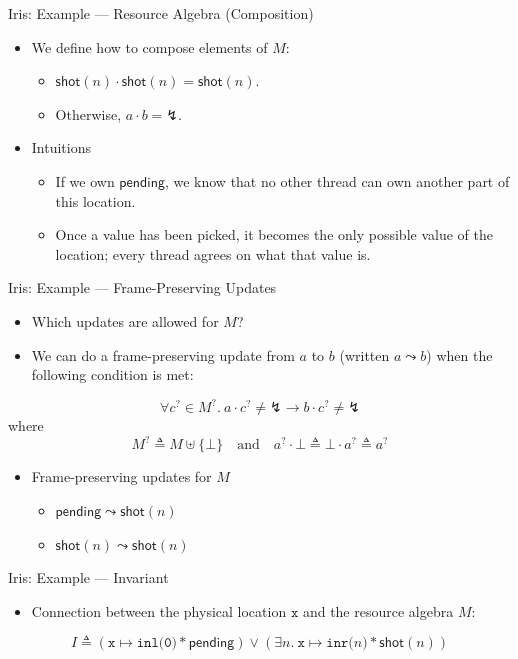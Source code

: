 \documentclass{beamer}
\newcommand{\pending}{\mathsf{pending}}
\newcommand{\shot}{\mathsf{shot}}
\newcommand{\invalid}{\mathord{\lightning}}
\begin{document}
\begin{frame}{Iris: Example --- Resource Algebra (Composition)}
  \begin{itemize}
    \item We define how to compose elements of $M$:
      \begin{itemize}
        \item $\shot(n)\cdot\shot(n)=\shot(n)$.
        \item Otherwise, $a\cdot b=\invalid$.
      \end{itemize}
    \item Intuitions
      \begin{itemize}
        \item If we own $\pending$, we know that no other thread can own another
          part of this location.
        \item Once a value has been picked, it becomes the only possible value of
          the location; every thread agrees on what that value is.
      \end{itemize}
  \end{itemize}
\end{frame}

\begin{frame}{Iris: Example --- Frame-Preserving Updates}
  \begin{itemize}
    \item Which updates are allowed for $M$?
    \item We can do a frame-preserving update from $a$ to $b$ (written
      $a\leadsto b$) when the following condition is met:
  \end{itemize}
  \[
    \forall c^{?}\in M^{?}.\ a\cdot c^{?}\neq\invalid
      \to b\cdot c^{?}\neq\invalid
  \]
  where
  \[
    M^{?}\triangleq M\uplus\{\bot\}\quad\text{and}\quad
    a^{?}\cdot\bot\triangleq\bot\cdot a^{?}\triangleq a^{?}
  \]
  \begin{itemize}
    \item Frame-preserving updates for $M$
      \begin{itemize}
        \item $\pending\leadsto\shot(n)$
        \item $\shot(n)\leadsto\shot(n)$
      \end{itemize}
  \end{itemize}
\end{frame}

\begin{frame}{Iris: Example --- Invariant}
  \begin{itemize}
    \item Connection between the physical location $\texttt{x}$ and the resource algebra $M$:
  \end{itemize}
  \[
    I\triangleq
      (\texttt{x}\mapsto\texttt{inl(0)}*\pending)
      \lor
      (\exists n.\ \texttt{x}\mapsto\texttt{inr(}n\texttt{)}*\shot(n))
  \]
\end{frame}
\end{document}
